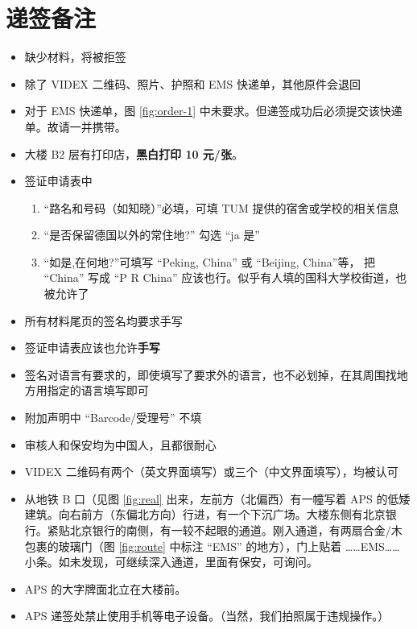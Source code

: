 \documentclass[final]{book}
\begin{document}
\section{递签备注}
\begin{itemize}
\item 缺少材料，将被拒签
\item 除了 VIDEX 二维码、照片、护照和 EMS 快递单，其他原件会退回
\item\label{visa-EMS} 对于 EMS 快递单，图 \ref{fig:order-1} 中未要求。但递签成功后必须提交该快递单。故请一并携带。
\item 大楼 B2 层有打印店，\textbf{黑白打印 10 元/张}。%
\item 签证申请表中
\begin{enumerate}
  \item “路名和号码（如知晓）”必填，可填 TUM 提供的宿舍或学校的相关信息
  \item “是否保留德国以外的常住地?” 勾选 ``ja 是''
  \item “如是,在何地?”可填写 ``Peking, China'' 或 ``Beijing, China''等， 把 ``China'' 写成 ``P R China'' 应该也行。似乎有人填的国科大学校街道，也被允许了
\end{enumerate}
\item 所有材料尾页的签名均要求手写
\item 签证申请表应该也允许\textbf{手写}
\item 签名对语言有要求的，即使填写了要求外的语言，也不必划掉，在其周围找地方用指定的语言填写即可
\item 附加声明中 ``Barcode/受理号'' 不填
\item 审核人和保安均为中国人，且都很耐心
\item VIDEX 二维码有两个（英文界面填写）或三个（中文界面填写），均被认可
\item 从地铁 B 口（见图 \ref{fig:real} 出来，左前方（北偏西）有一幢写着 APS 的低矮建筑。向右前方（东偏北方向）行进，有一个下沉广场。大楼东侧有北京银行。紧贴北京银行的南侧，有一较不起眼的通道。刚入通道，有两扇合金/木包裹的玻璃门（图 \ref{fig:route} 中标注 ``EMS'' 的地方），门上贴着 ……EMS…… 小条。如未发现，可继续深入通道，里面有保安，可询问。
\item APS 的大字牌面北立在大楼前。
\item APS 递签处禁止使用手机等电子设备。（当然，我们拍照属于违规操作。）
\end{itemize}
\end{document}
